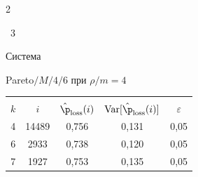\begin{multicols}{2}
\begin{center}
\end{center}





















\addtocounter{table}{1}








\noindent


\begin{center}  %




{{\tablename~3}\ \ \small{Система


Pareto$/M/4/6$  при $\rho/m=4$}}


\vspace*{2ex}





{\small 


\tabcolsep=7pt


\begin{tabular}{|c|c|c|c|c|}


\hline


&&&&\\[-9pt]


 $k$ & $i$   &$\hat{\p}_{\mathrm{loss}}(i)$ &  $\mathrm{Var}[\hat{\p}_{\mathrm{loss}}(i)]$ & $\varepsilon$ \\


 \hline


4& 14489\hphantom{9}& 0,756& 0,131& 0,05\\ 


6& 2933& 0,738& 0,120& 0,05\\ 


7& 1927& 0,753& 0,135& 0,05\\


 \hline


\end{tabular} 


}





\end{center}
\end{multicols}
